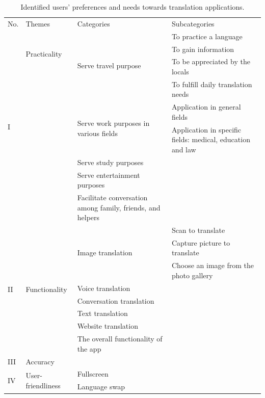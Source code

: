 \documentclass[english]{textolivre}
\begin{document}
\begin{longtable}{p{1cm} p{2.5cm} p{4.5cm} p{5cm}}
\caption{Identified users’ preferences and needs towards translation applications.}
\label{tbl1}
\footnotesize
\\
\toprule
No. & Themes & Categories & Subcategories \\ 
\midrule
\multirow{9}{=}{I} & \multirow{3}{=}{Practicality} & \multirow{4}{=}{Serve travel purpose} & To practice a language \\
& & & To gain information \\
& & & To be appreciated by the locals \\
& & & To fulfill daily translation needs \\
\cmidrule{3-4}
& & \multirow{2}{=}{Serve work purposes in various fields} & Application in general fields \\
& & & Application in specific fields: medical, education and law \\
\cmidrule{3-4}
& & Serve study purposes & \cellcolor[HTML]{EFEFEF} \\
&  & Serve entertainment purposes & \cellcolor[HTML]{EFEFEF} \\
& & Facilitate conversation among family, friends, and helpers & \cellcolor[HTML]{EFEFEF} \\
\midrule
\multirow{8}{=}{II} & \multirow{8}{=}{Functionality} & \multirow{3}{=}{Image translation} & Scan to translate \\
& & & Capture picture to translate \\
& & & Choose an image from the photo gallery \\
\cmidrule{3-4}
& & Voice translation & \cellcolor[HTML]{EFEFEF} \\
\cmidrule{3-4}
& & Conversation translation & \cellcolor[HTML]{EFEFEF} \\
\cmidrule{3-4}
& & Text translation & \cellcolor[HTML]{EFEFEF} \\
\cmidrule{3-4}
& & Website translation & \cellcolor[HTML]{EFEFEF} \\
\cmidrule{3-4}
& & The overall functionality of the app & \cellcolor[HTML]{EFEFEF} \\
\midrule
III & Accuracy & \cellcolor[HTML]{EFEFEF} & \cellcolor[HTML]{EFEFEF} \\
\midrule
\multirow{5}{=}{IV} & \multirow{5}{=}{User-friendliness} & Fullscreen & \cellcolor[HTML]{EFEFEF} \\
\cmidrule{3-4}
& & Language swap & \cellcolor[HTML]{EFEFEF} \\

\end{longtable}
\end{document}
